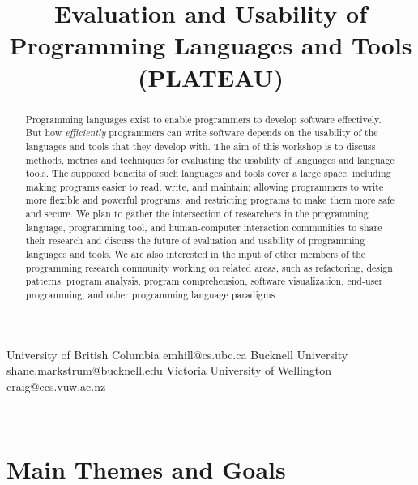 \documentclass{sigplanconf}
\begin{document}
\title{Evaluation and Usability of Programming Languages and Tools (PLATEAU)}

           {University of British Columbia}
           {emhill@cs.ubc.ca}
           {Bucknell University}
           {shane.markstrum@bucknell.edu}
           {Victoria University of Wellington}
           {craig@ecs.vuw.ac.nz}

\date{}

\maketitle
\begin{abstract}

  Programming languages exist to enable programmers to develop
  software effectively.  But how \emph{efficiently} programmers can
  write software depends on the usability of the languages and tools
  that they develop with.  The aim of this workshop is to discuss
  methods, metrics and techniques for evaluating the usability of
  languages and language tools.  The supposed benefits of such
  languages and tools cover a large space, including making programs
  easier to read, write, and maintain; allowing programmers to write
  more flexible and powerful programs; and restricting programs to
  make them more safe and secure. We plan to gather the intersection
  of researchers in the programming language, programming tool, and
  human-computer interaction communities to share their research and
  discuss the future of evaluation and usability of programming
  languages and tools. We are also interested in the input of other
  members of the programming research community working on related
  areas, such as refactoring, design patterns, program analysis,
  program comprehension, software visualization, end-user programming,
  and other programming language paradigms.

\end{abstract}

\\




\section{Main Themes and Goals}
\end{document}
